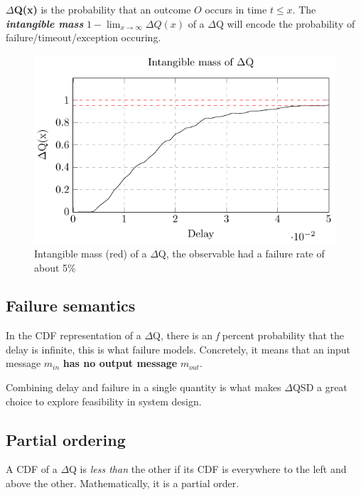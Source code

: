     \textbf{$\Delta$Q(x)} is the probability that an outcome $O$ occurs in time $t \le x$. The \textbf{\textit{intangible mass}} $1 - \lim_{x\to\infty}\Delta Q(x)$ of a $\Delta$Q will encode the probability of failure/timeout/exception occuring. \cite{myo}
    
    \begin{figure}[H]
        \begin{center}
            \includegraphics{tikz/intangible.pdf}
        \end{center}
        \caption{Intangible mass (red) of a $\Delta$Q, the observable had a failure rate of about 5\% }
    \end{figure}
   
  \subsection{Failure semantics}
       In the CDF representation of a $\Delta$Q, there is an \textit{f} percent probability that the delay is infinite, this is what failure models. 
        Concretely, it means that an input message $m_{in}$ \textbf{has no output message} $m_{out}$. \cite{art}

        Combining delay and failure in a single quantity is what makes $\Delta$QSD a great choice to explore feasibility in system design. \cite{dq-tut}
   
    \subsection{Partial ordering}
        A CDF of a $\Delta$Q is \textit{less than} the other if its CDF is everywhere to the left and above the other. Mathematically, it is a partial order. 
        
